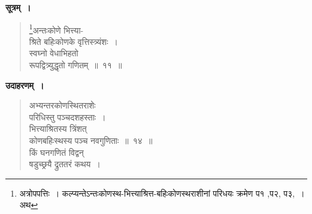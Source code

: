 \documentclass[11pt, openany]{book}
\begin{document}
\textbf{सूत्रम्~।}

\begin{quote}
{\gk \renewcommand{\thefootnote}{१}\footnote{अत्रोपपत्तिः~। कल्प्यन्तेऽन्तःकोणस्थ-भित्त्याश्रित्त-बहिःकोणस्थराशीनां परिधयः क्रमेण प१ ,प२, प३,~। अथ\textendash }अन्तःकोणे भित्त्या-\\
श्रिते बहिःकोणके वृत्तिस्त्र्यंशः~।\\
स्वघ्नो वेधाभिहतो\\
रूपद्वित्र्युद्धृतो गणितम्~॥~११~॥}
\end{quote}

\newpage

\textbf{उदाहरणम्~।}

\begin{quote}
{\ex अभ्यन्तरकोणस्थितराशेः\\
परिधिस्तु पञ्चदशहस्ताः~।\\
भित्त्याश्रितस्य त्रिंशत्\\
कोणबहिःस्थस्य पञ्च नवगुणिताः~॥~१४~॥\\
किं घनगणितं विद्वन्\\
षडुच्छ्रयै द्रुततरं कथय~।	}
\end{quote}
\end{document}
